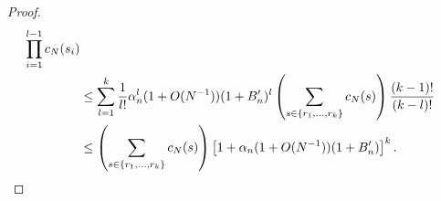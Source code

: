 \documentclass{article}
\newcommand{\1}[1]{\mathbbm{1}_{#1}}
\begin{document}
\begin{proof}
\begin{align}
\prod_{i=1}^{l-1} c_N(s_i)  \notag\\
&\leq \sum_{l=1}^{k} \frac{1}{l!} \alpha_n^l (1+O(N^{-1}))
(1 + B_n^\prime)^l \left( \sum_{s\in \{r_1,\dots,r_k\} } c_N(s) \right)
\frac{(k-1)!}{(k-l)!} \notag\\
&\leq \left( \sum_{s\in \{r_1,\dots,r_k\} } c_N(s) \right)
\left[ 1 + \alpha_n (1+O(N^{-1})) (1 + B_n^\prime) \right]^k .
\end{align}

\end{proof}
\end{document}
